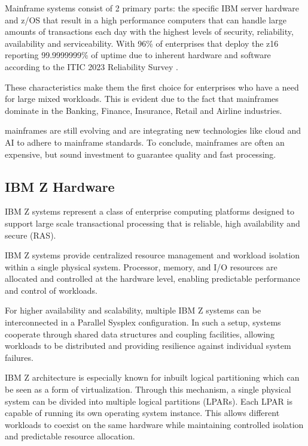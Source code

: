 Mainframe systems consist of 2 primary parts: the specific IBM server hardware and z/OS that result in a high performance computers that can handle large amounts of transactions each day with the highest levels of security, reliability, availability and serviceability. With 96\% of enterprises that deploy the z16 reporting 99.9999999\% of uptime due to inherent hardware and software according to the ITIC 2023 Reliability Survey \autocite{itic2023}.  

These characteristics make them the first choice for enterprises who have a need for large mixed workloads.
This is evident due to the fact that mainframes dominate in the Banking, Finance, Insurance, Retail and Airline industries.  
\autocite{ibm2025_mainframe}

mainframes are still evolving and are integrating new technologies like cloud and AI to adhere to mainframe standards. 
To conclude, mainframes are often an expensive, but sound investment to guarantee quality and fast processing. 

\subsection{IBM Z Hardware}%
\label{subsec:z-hardware}

IBM Z systems represent a class of enterprise computing platforms designed to support large scale transactional processing that is reliable, high availability and secure (RAS). 

IBM Z systems provide centralized resource management and workload isolation within a single physical system. Processor, memory, and I/O resources are allocated and controlled at the hardware level, enabling predictable performance and control of workloads.

For higher availability and scalability, multiple IBM Z systems can be interconnected in a Parallel Sysplex configuration. In such a setup, systems cooperate through shared data structures and coupling facilities, allowing workloads to be distributed and providing resilience against individual system failures.

IBM Z architecture is especially known for inbuilt logical partitioning which can be seen as a form of virtualization. Through this mechanism, a single physical system can be divided into multiple logical partitions (LPARs). Each LPAR is capable of running its own operating system instance. This allows different workloads to coexist on the same hardware while maintaining controlled isolation and predictable resource allocation.

